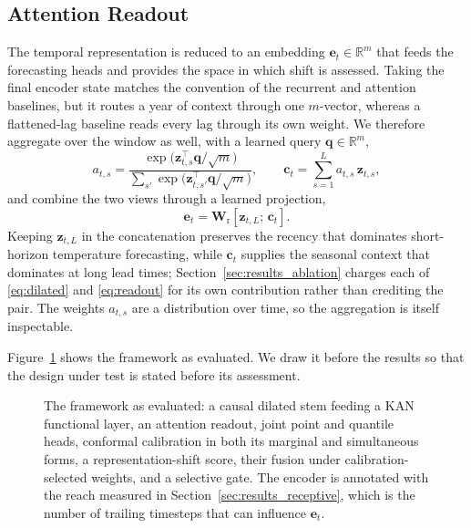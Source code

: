 \subsection{Attention Readout}
\label{sec:readout}
The temporal representation is reduced to an embedding $\mathbf{e}_t\in\mathbb{R}^{m}$ that feeds the forecasting heads and provides the space in which shift is assessed. Taking the final encoder state matches the convention of the recurrent and attention baselines, but it routes a year of context through one $m$-vector, whereas a flattened-lag baseline reads every lag through its own weight. We therefore aggregate over the window as well, with a learned query $\mathbf{q}\in\mathbb{R}^{m}$,
\begin{equation}
a_{t,s}=\frac{\exp\!\big(\mathbf{z}_{t,s}^{\top}\mathbf{q}/\sqrt{m}\big)}{\sum_{s'}\exp\!\big(\mathbf{z}_{t,s'}^{\top}\mathbf{q}/\sqrt{m}\big)},\qquad
\mathbf{c}_t=\sum_{s=1}^{L}a_{t,s}\,\mathbf{z}_{t,s},
\label{eq:attention}
\end{equation}
and combine the two views through a learned projection,
\begin{equation}
\mathbf{e}_t=\mathbf{W}_{\mathrm{r}}\left[\mathbf{z}_{t,L};\,\mathbf{c}_t\right].
\label{eq:readout}
\end{equation}
Keeping $\mathbf{z}_{t,L}$ in the concatenation preserves the recency that dominates short-horizon temperature forecasting, while $\mathbf{c}_t$ supplies the seasonal context that dominates at long lead times; Section~\ref{sec:results_ablation} charges each of \eqref{eq:dilated} and \eqref{eq:readout} for its own contribution rather than crediting the pair. The weights $a_{t,s}$ are a distribution over time, so the aggregation is itself inspectable.

Figure~\ref{fig:framework} shows the framework as evaluated. We draw it before the results so that the design under test is stated before its assessment.

\begin{figure}[t]
\centering
\resizebox{\textwidth}{!}{}
\caption{The \method{} framework as evaluated: a causal dilated stem feeding a KAN functional layer, an attention readout, joint point and quantile heads, conformal calibration in both its marginal and simultaneous forms, a representation-shift score, their fusion under calibration-selected weights, and a selective gate. The encoder is annotated with the reach measured in Section~\ref{sec:results_receptive}, which is the number of trailing timesteps that can influence $\mathbf{e}_t$.}
\label{fig:framework}
\end{figure}

